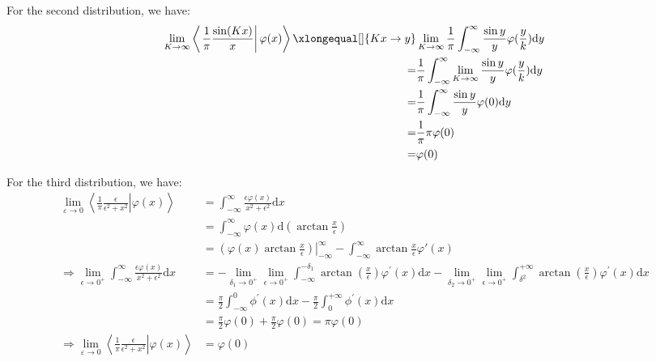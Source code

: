 \documentclass[]{ctexart}
\newcommand{\di}{\mathrm{d}}
\begin{document}
	For the second distribution, we have:
		\begin{equation*}
		\begin{aligned}
			\lim _{K\rightarrow \infty}\left\langle\left.\frac{1}{\pi} \frac{\sin(Kx)}{x} \right|\varphi(x)\right\rangle\xlongequal[]{Kx\to y}&\lim _{K\rightarrow \infty}\frac{1}{\pi}\int_{-\infty}^{\infty}\frac{\sin y}{y}\varphi(\frac{y}{k})\di y\\
			=&\frac{1}{\pi}\int_{-\infty}^{\infty}\lim _{K\rightarrow \infty}\frac{\sin y}{y}\varphi(\frac{y}{k})\di y\\
			=&\frac{1}{\pi}\int_{-\infty}^{\infty}\frac{\sin y}{y}\varphi(0)\di y\\
			=&\frac{1}{\pi}\pi\varphi(0)\\
			=&\varphi(0)
		\end{aligned}
		\end{equation*}
	
	For the third distribution, we have:
		\begin{equation*}
		\begin{aligned}
			\lim _{\varepsilon\rightarrow 0}\left\langle\left.\frac{1}{\pi} \frac{\epsilon}{\epsilon^2+x^2} \right|\varphi(x)\right\rangle
			&=\int_{-\infty}^{\infty} \frac{\epsilon \varphi(x)}{x^{2}+\epsilon^{2}} \di x\\
			&=\int_{-\infty}^{\infty} \varphi(x) \di\left(\arctan \frac{x}{\epsilon}\right)\\
			&=\left.\left(\varphi(x)\arctan \frac{x}{\epsilon}\right)\right|_{-\infty} ^{\infty}-\int_{-\infty}^{\infty}\arctan \frac{x}{\epsilon}\varphi'\left( x\right) \\
			\Rightarrow \lim _{\epsilon \rightarrow 0^{+}} \int_{-\infty}^{\infty} \frac{\epsilon\varphi( x)}{x^{2}+\epsilon^{2}}\di x&=-\lim _{\delta_{1} \rightarrow 0^{+}} \lim _{\epsilon\to 0^{+}} \int_{-\infty}^{-\delta_{1}} \arctan \left(\frac{x}{\epsilon}\right) \varphi^{\prime}(x) \di x-
			\lim\limits_{\delta_{2} \rightarrow 0^{+}} \lim\limits_{\epsilon \rightarrow 0^{+}} \int_{\delta^{2}}^{+\infty} \arctan \left(\frac{x}{\epsilon}\right) \varphi^{\prime}(x) \di x \\
			&=\frac{\pi}{2} \int_{-\infty}^{0} \phi^{\prime}(x) \di x-\frac{\pi}{2} \int_{0}^{+\infty} \phi^{\prime}(x) \di x\\
			&=\frac{\pi}{2}\varphi(0)+\frac{\pi}{2} \varphi(0)=\pi \varphi(0)\\
			\Rightarrow \lim _{\varepsilon\rightarrow 0}\left\langle\left.\frac{1}{\pi} \frac{\epsilon}{\epsilon^2+x^2} \right|\varphi(x)\right\rangle&=\varphi(0)
		\end{aligned}
		\end{equation*}
		
\end{document}
